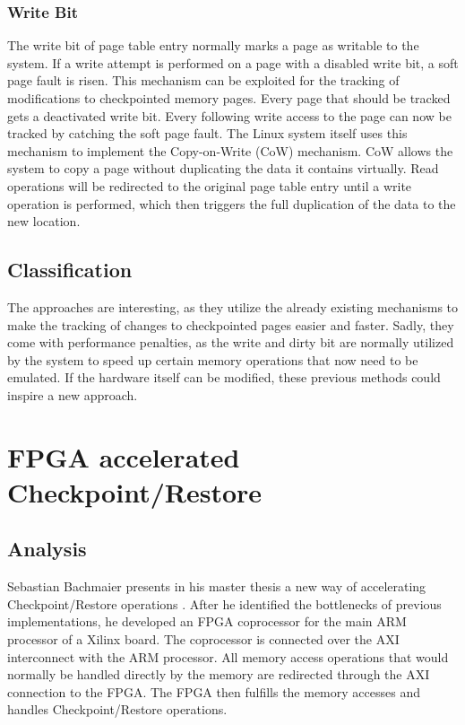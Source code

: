 \subsubsection{Write Bit}
The write bit of page table entry normally marks a page as writable to
the system. If a write attempt is performed on a page with a disabled write
bit, a soft page fault is risen. This mechanism can be exploited for the
tracking of modifications to checkpointed memory pages.
Every page that should be tracked gets a deactivated write bit.
Every following write access to the page can now be tracked by catching the
soft page fault.
The Linux system itself uses this mechanism to implement the Copy-on-Write (CoW)
mechanism. CoW allows the system to copy a page without duplicating the data it contains virtually. Read operations will be redirected
to the original page table entry until a write operation is performed,
which then triggers the full duplication of the data to the new location.

\subsection{Classification}
The approaches are interesting, as they utilize the already existing mechanisms
to make the tracking of changes to checkpointed pages easier and faster.
Sadly, they come with performance penalties, as the write and dirty bit
are normally utilized by the system to speed up certain memory operations that
now need to be emulated.
If the hardware itself can be modified, these previous methods could inspire a
new approach.

\section{FPGA accelerated Checkpoint/Restore}
\subsection{Analysis}
Sebastian Bachmaier presents in his master thesis a new way of
accelerating Checkpoint/Restore operations
\cite{sebastian_bachmaier_optimizing_genode_cr_fpga}. After he identified
the bottlenecks of previous implementations, he developed an FPGA coprocessor
for the main ARM processor of a Xilinx board. The coprocessor is connected
over the AXI interconnect with the ARM processor. All memory access operations
that would normally be handled directly by the memory are redirected through
the AXI connection to the FPGA. The FPGA then fulfills the memory accesses
and handles Checkpoint/Restore operations.

